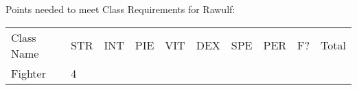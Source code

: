 \documentclass[12pt]{article}
\begin{document}
Points needed to meet Class Requirements for Rawulf:

\begin{longtable}[]{@{}llllllllll@{}}
\toprule
\begin{minipage}[t]{0.13\columnwidth}\raggedright\strut
Class Name
\strut\end{minipage} &
\begin{minipage}[t]{0.06\columnwidth}\raggedright\strut
STR
\strut\end{minipage} &
\begin{minipage}[t]{0.06\columnwidth}\raggedright\strut
INT
\strut\end{minipage} &
\begin{minipage}[t]{0.06\columnwidth}\raggedright\strut
PIE
\strut\end{minipage} &
\begin{minipage}[t]{0.06\columnwidth}\raggedright\strut
VIT
\strut\end{minipage} &
\begin{minipage}[t]{0.06\columnwidth}\raggedright\strut
DEX
\strut\end{minipage} &
\begin{minipage}[t]{0.06\columnwidth}\raggedright\strut
SPE
\strut\end{minipage} &
\begin{minipage}[t]{0.06\columnwidth}\raggedright\strut
PER
\strut\end{minipage} &
\begin{minipage}[t]{0.07\columnwidth}\raggedright\strut
F?
\strut\end{minipage} &
\begin{minipage}[t]{0.08\columnwidth}\raggedright\strut
Total
\strut\end{minipage}\tabularnewline
\begin{minipage}[t]{0.13\columnwidth}\raggedright\strut
Fighter
\strut\end{minipage} &
\begin{minipage}[t]{0.06\columnwidth}\raggedright\strut
4
\strut\end{minipage} &
\begin{minipage}[t]{0.06\columnwidth}\raggedright\strut
\strut\end{minipage} &
\begin{minipage}[t]{0.06\columnwidth}\raggedright\strut
\strut\end{minipage} &
\begin{minipage}[t]{0.06\columnwidth}\raggedright\strut
\strut\end{minipage} &

\end{longtable}
\end{document}
